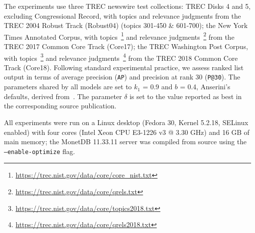 The experiments use three TREC newswire test collections: TREC Disks 4 and 5, excluding Congressional Record, with topics and relevance judgments from the TREC 2004 Robust Track (Robust04) (topics 301-450 \& 601-700); the New York Times Annotated Corpus, with topics~\footnote{\url{https://trec.nist.gov/data/core/core_nist.txt}} and relevance judgments~\footnote{\url{https://trec.nist.gov/data/core/qrels.txt}} from the TREC 2017 Common Core Track (Core17); the TREC Washington Post Corpus, with topics~\footnote{\url{https://trec.nist.gov/data/core/topics2018.txt}} and relevance judgments~\footnote{\url{https://trec.nist.gov/data/core/qrels2018.txt}} from the TREC 2018 Common Core Track (Core18). Following standard experimental practice, we assess ranked list output in terms of average precision (\texttt{AP}) and precision at rank 30 (\texttt{P@30}). The parameters shared by all models are set to $k_1$ = 0.9 and $b$ = 0.4, Anserini’s defaults, derived from~\citet{ATIRE}. The parameter $\delta$ is set to the value reported as best in the corresponding source publication. 

All experiments were run on a Linux desktop (Fedora 30, Kernel 5.2.18, SELinux enabled) with four cores (Intel Xeon CPU E3-1226 v3 @ 3.30 GHz) and 16 GB of main memory; the MonetDB 11.33.11 server was compiled from source using the \texttt{---enable-optimize} flag.

